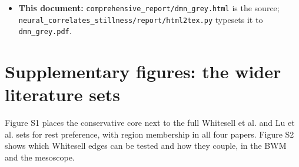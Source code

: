 \documentclass[10pt,a4paper]{article}
\begin{document}
\begin{itemize}
\begin{itemize}
\item \texttt{neural\_\allowbreak{}correlates\_\allowbreak{}stillness/\allowbreak{}30\_\allowbreak{}allen\_\allowbreak{}matched.py}: IBL with the Allen definitions.
\item \texttt{32\_\allowbreak{}null\_\allowbreak{}onsets.py}: IBL null and onset rules.
\item Figure 18 and \texttt{output/\allowbreak{}31\_\allowbreak{}allen\_\allowbreak{}compare.json} come from \texttt{report/\allowbreak{}fig\_\allowbreak{}allen.py}.
\item Figure 19 and \texttt{output/\allowbreak{}33\_\allowbreak{}allen\_\allowbreak{}followup.json} (every number in sections 13.4 and 14) come from \texttt{report/\allowbreak{}fig\_\allowbreak{}allen\_\allowbreak{}followup.py}.
\end{itemize}
\item \textbf{This document:} \texttt{comprehensive\_\allowbreak{}report/\allowbreak{}dmn\_\allowbreak{}grey.html} is the source; \texttt{neural\_\allowbreak{}correlates\_\allowbreak{}stillness/\allowbreak{}report/\allowbreak{}html2tex.py} typesets it to \texttt{dmn\_\allowbreak{}grey.pdf}.
\end{itemize}
\section{Supplementary figures: the wider literature sets}
Figure S1 places the conservative core next to the full Whitesell et al. and Lu et al. sets for rest preference, with region membership in all four papers. Figure S2 shows which Whitesell edges can be tested and how they couple, in the BWM and the mesoscope.
\end{document}

